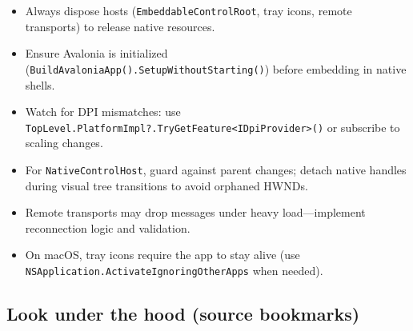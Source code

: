\begin{itemize}
\tightlist
\item
  Always dispose hosts (\passthrough{\lstinline!EmbeddableControlRoot!},
  tray icons, remote transports) to release native resources.
\item
  Ensure Avalonia is initialized
  (\passthrough{\lstinline!BuildAvaloniaApp().SetupWithoutStarting()!})
  before embedding in native shells.
\item
  Watch for DPI mismatches: use
  \passthrough{\lstinline!TopLevel.PlatformImpl?.TryGetFeature<IDpiProvider>()!}
  or subscribe to scaling changes.
\item
  For \passthrough{\lstinline!NativeControlHost!}, guard against parent
  changes; detach native handles during visual tree transitions to avoid
  orphaned HWNDs.
\item
  Remote transports may drop messages under heavy load---implement
  reconnection logic and validation.
\item
  On macOS, tray icons require the app to stay alive (use
  \passthrough{\lstinline!NSApplication.ActivateIgnoringOtherApps!} when
  needed).
\end{itemize}

\subsection{Look under the hood (source
bookmarks)}\label{look-under-the-hood-source-bookmarks-29}

